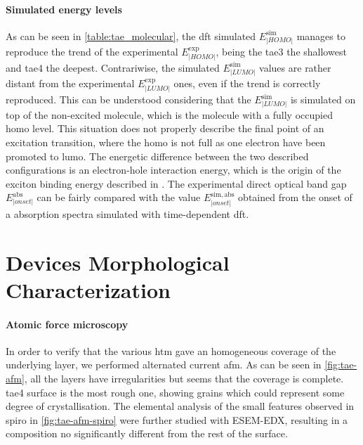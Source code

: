 	\paragraph{Simulated energy levels}
	As can be seen in \cref{table:tae_molecular}, the \gls{dft} simulated $E^{\mathrm{sim}}_|HOMO|$ manages to reproduce the trend of the experimental $E^{\mathrm{exp}}_|HOMO|$, being the \gls{tae3} the shallowest and \gls{tae4} the deepest.
	Contrariwise, the simulated $E^{\mathrm{sim}}_|LUMO|$ values are rather distant from the experimental $E^{\mathrm{exp}}_|LUMO|$ ones, even if the trend is correctly reproduced.
	This can be understood considering that the $E^{\mathrm{sim}}_|LUMO|$ is simulated on top of the non\hyp{}excited molecule, which is the molecule with a fully occupied \gls{homo} level.
	This situation does not properly describe the final point of an excitation transition, where the \gls{homo} is not full as one electron have been promoted to \gls{lumo}.
	The energetic difference between the two described configurations is an electron\hyp{}hole interaction energy, which is the origin of the exciton binding energy described in .
	The experimental direct optical band gap \small$E^{\mathrm{abs}}_|onset|$ can be fairly compared with the value $E^{\mathrm{sim,abs}}_|onset|$ obtained from the onset of a absorption spectra simulated with time\hyp{}dependent \gls{dft}.



\section{Devices Morphological Characterization}

	\paragraph{Atomic force microscopy}
	In order to verify that the various \gls{htm} gave an homogeneous coverage of the underlying layer, we performed alternated current \gls{afm}.
	As can be seen in \cref{fig:tae-afm}, all the layers have irregularities but seems that the coverage is complete.
	\Gls{tae4} surface is the most rough one, showing grains which could represent some degree of crystallisation.
	The elemental analysis of the small features observed in \gls{spiro} in \cref{fig:tae-afm-spiro} were further studied with ESEM-EDX, resulting in a composition no significantly different from the rest of the surface.
	
